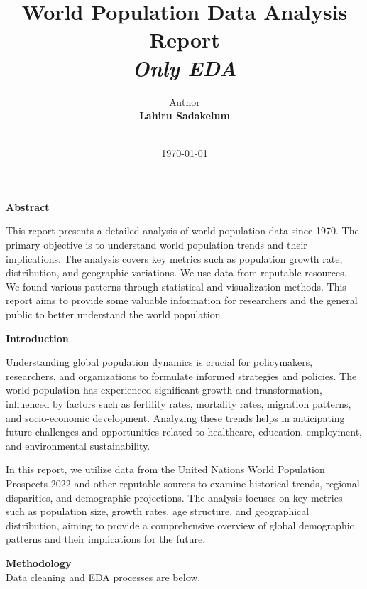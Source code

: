 \documentclass[12pt]{article}
\title{
    \vspace{2in} %
    \Huge \textbf{World Population Data Analysis Report} \\
    \vspace{0.5in} %
    \Large \textit{Only EDA} \\
    \vspace{1in} %
}
\author{
    Author
    \vspace{0.1in} \\
    \textbf{Lahiru Sadakelum} \\
    \vspace{0.5in} \\
}
\date{\today}
\begin{document}
\maketitle

\thispagestyle{empty} 

\newpage

\vspace{0.2in} 
\begin{center}
\Large
\textbf{Abstract}
\vspace{0.1in} 
\end{center}
        \large
       This report presents a detailed analysis of world population data since 1970. The primary objective is to understand world population trends and their implications. The analysis covers key metrics such as population growth rate, distribution, and geographic variations. We use data from reputable resources. We found various patterns through statistical and visualization methods. This report aims to provide some valuable information for researchers and the general public to better understand the world population

\vspace{0.9in} 
\begin{center}
\Large
\textbf{Introduction}
\vspace{0.1in} 
\end{center}
    Understanding global population dynamics is crucial for policymakers, researchers, and organizations to formulate informed strategies and policies. The world population has experienced significant growth and transformation, influenced by factors such as fertility rates, mortality rates, migration patterns, and socio-economic development. Analyzing these trends helps in anticipating future challenges and opportunities related to healthcare, education, employment, and environmental sustainability.\vspace{0.08in} 

    In this report, we utilize data from the United Nations World Population Prospects 2022 and other reputable sources to examine historical trends, regional disparities, and demographic projections. The analysis focuses on key metrics such as population size, growth rates, age structure, and geographical distribution, aiming to provide a comprehensive overview of global demographic patterns and their implications for the future.

\newpage
\vspace{1in} 
\begin{center}
\Large
\textbf{Methodology}
\vspace{0.1in} \\
\Large \vspace{0.1in} Data cleaning and EDA processes are below.
\end{center}
\end{document}
